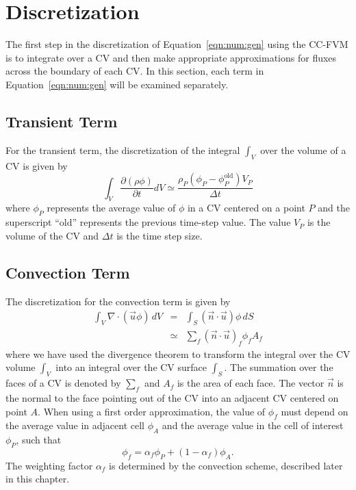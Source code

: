 \section{Discretization}

The first step in the discretization of Equation~\eqref{eqn:num:gen}
using the CC-FVM is to integrate over a CV and then make appropriate
approximations for fluxes across the boundary of each CV.  In this
section, each term in Equation~\eqref{eqn:num:gen} will be examined
separately.

\subsection{Transient Term}

For the transient term, the discretization of the integral \( \int_V
\) over the volume of a CV is given by
\begin{equation}
\int_V \frac{\partial (\rho \phi)}{\partial t} dV
\simeq
\frac{\rho_{P}(\phi_{P} - \phi_P^\text{old}) V_P}{\Delta t}
\label{eqn:num:tra}
\end{equation}
where \( \phi_P \) represents the average value of \( \phi \) in a CV
centered on a point \( P \) and the superscript ``$\text{old}$''
represents the previous time-step value.  The value $V_P$ is the
volume of the CV and $\Delta t$ is the time step size.

\subsection{Convection Term}

The discretization for the convection term is given by
\begin{eqnarray}
\int_V \nabla \cdot (\vec{u} \phi)\,dV & = & 
\int_S (\vec{n} \cdot \vec{u})\phi\,dS \\
& \simeq & \sum_{f} (\vec{n} \cdot \vec{u})_f \phi_f A_f
\label{eqn:num:con}
\end{eqnarray}
where we have used the divergence theorem to transform the integral
over the CV volume \( \int_V \) into an integral over the CV surface
\( \int_S \).  The summation over the faces of a CV is denoted by
$\sum_{f}$ and $A_f$ is the area of each face.  The vector $\vec{n}$
is the normal to the face pointing out of the CV into an adjacent CV
centered on point \( A \).  When using a first order approximation,
the value of $\phi_f$ must depend on the average value in adjacent
cell $\phi_A$ and the average value in the cell of interest $\phi_P$,
such that
\begin{equation}
\phi_f=\alpha_f \phi_P +(1-\alpha_f)\phi_A.
\end{equation}
The weighting factor $\alpha_f$ is determined by the convection
scheme, described later in this chapter.

